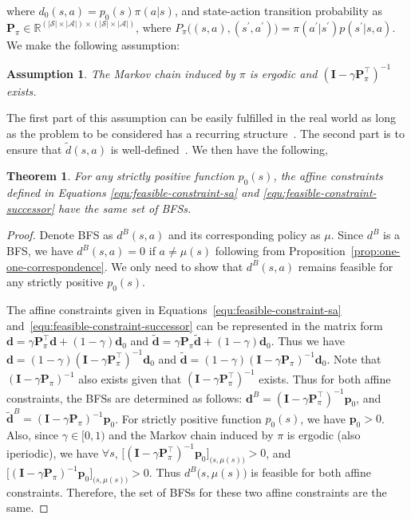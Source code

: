 \documentclass[letterpaper]{article} %
\newtheorem{theorem}{Theorem}
\newtheorem{assumption}{Assumption}
\newcommand{\m}[1]{\mathbf{#1}}
\begin{document}
where $d_0(s, a) = p_0(s)\pi(a|s)$, 
and state-action transition probability as $\m{P}_{\pi}\in\mathbb{R}^{(|\mathcal{S}|\times|\mathcal{A}|)\times (|\mathcal{S}|\times|\mathcal{A}|)}$, 
where $P_{\pi}\big( (s, a), (s^\prime, a^\prime)\big)=\pi(a^\prime|s^\prime)p(s^\prime|s, a)$. 
We make the following assumption: 
\begin{assumption}
The Markov chain induced by $\pi$ is ergodic and $(\m{I} - \gamma \m{P}_{\pi}^\top)^{-1}$ exists. 
\end{assumption}
The first part of this assumption can be easily fulfilled in the real world as long as the problem to be considered has a recurring structure~\cite{levin2017markov}. 
The second part is to ensure that $\tilde{d}(s, a)$ is well-defined~\cite{yu2015convergence}. 
We then have the following, 
\begin{theorem}\label{theo:bfs-invariant}
For any strictly positive function $p_0(s)$, the affine constraints defined in Equations \eqref{equ:feasible-constraint-sa} and \eqref{equ:feasible-constraint-successor} have the same set of BFSs. 
\end{theorem}
\begin{proof}
Denote BFS as $d^B(s, a)$ and its corresponding policy as $\mu$.
Since $d^B$ is a BFS, we have $d^B(s, a)=0$ if $a\neq\mu(s)$ following from Proposition~\ref{prop:one-one-correspondence}. 
We only need to show that $d^B(s, a)$ remains feasible for any strictly positive $p_0(s)$. 

The affine constraints given in Equations~\eqref{equ:feasible-constraint-sa} and~\eqref{equ:feasible-constraint-successor} can be represented in the matrix form 
$\m{d} = \gamma \m{P}_{\pi}^\top\m{d} + (1-\gamma) \m{d}_0$ 
and $\tilde{\m{d}} = \gamma \m{P}_{\pi}\tilde{\m{d}} + (1-\gamma) \m{d}_0$. 
Thus we have $\m{d} = (1-\gamma) (\m{I} - \gamma \m{P}_{\pi}^\top)^{-1} \m{d}_0$
and $\tilde{\m{d}} = (1-\gamma) (\m{I} - \gamma \m{P}_{\pi})^{-1} \m{d}_0$.
Note that $(\m{I} - \gamma \m{P}_{\pi})^{-1}$ also exists given that $(\m{I} - \gamma \m{P}_{\pi}^\top)^{-1}$ exists. 
Thus for both affine constraints, the BFSs are determined as follows: 
$\m{d}^B = (\m{I} - \gamma \m{P}^\top_{\pi})^{-1} \m{p}_0$, 
and $\tilde{\m{d}}^B = (\m{I} - \gamma \m{P}_{\pi})^{-1} \m{p}_0$. 
For strictly positive function $p_0(s)$, we have $\m{p}_0 > 0$.
Also, since $\gamma\in [0, 1)$ and the Markov chain induced by $\pi$ is ergodic (also iperiodic), 
we have $\forall s$, $\big[(\m{I} - \gamma \m{P}^\top_{\pi})^{-1} \m{p}_0 \big]_{\big(s,\mu(s)\big)} > 0$, 
and $\big[(\m{I} - \gamma \m{P}_{\pi})^{-1} \m{p}_0 \big]_{\big(s,\mu(s)\big)} > 0$.
Thus $d^B\big(s, \mu(s) \big)$ is feasible for both affine constraints. 
Therefore, the set of BFSs for these two affine constraints are the same. 
\end{proof}
\end{document}
